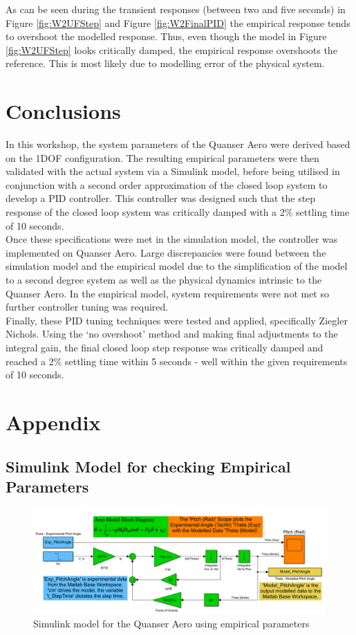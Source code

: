 \documentclass[11pt]{article}
\begin{document}
As can be seen during the transient responses (between two and five seconds) in Figure \ref{fig:W2UFStep} and Figure \ref{fig:W2FinalPID} the empirical response tends to overshoot the modelled response. Thus, even though the model in Figure \ref{fig:W2UFStep} looks critically damped, the empirical response overshoots the reference. This is most likely due to modelling error of the physical system.

\section{Conclusions}
In this workshop, the system parameters of the Quanser Aero were derived based on the 1DOF configuration. The resulting empirical parameters were then validated with the actual system via a Simulink model, before being utilised in conjunction with a second order approximation of the closed loop system to develop a PID controller. This controller was designed such that the step response of the closed loop system was critically damped with a 2\% settling time of 10 seconds. \\

Once these specifications were met in the simulation model, the controller was implemented on Quanser Aero. Large discrepancies were found between the simulation model and the empirical model due to the simplification of the model to a second degree system as well as the physical dynamics intrinsic to the Quanser Aero. In the empirical model, system requirements were not met so further controller tuning was required. \\

Finally, these PID tuning techniques were tested and applied, specifically Ziegler Nichols. Using the `no overshoot' method and making final adjustments to the integral gain, the final closed loop step response was critically damped and reached a 2\% settling time within 5 seconds - well within the given requirements of 10 seconds.

\newpage
\section{Appendix}
\subsection{Simulink Model for checking Empirical Parameters}\label{sim_check_emp}
\begin{figure}[ht!]
    \centering
    \includegraphics[scale=0.5]{WS2_SimModel.PNG} %
    \caption{Simulink model for the Quanser Aero using empirical parameters}
    \label{fig:sim_check_emp}
\end{figure}
\end{document}
